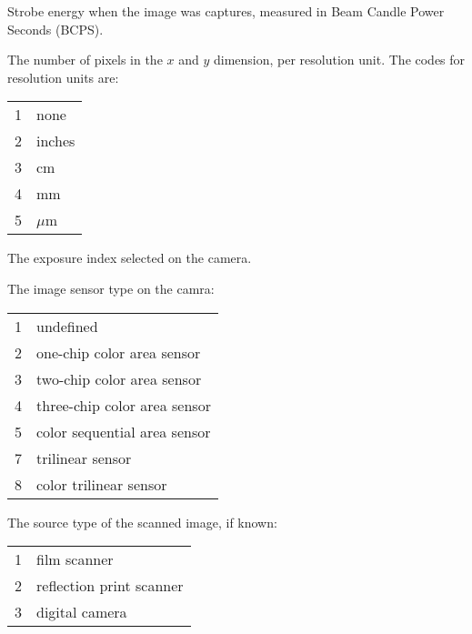 
Strobe energy when the image was captures, measured in Beam Candle Power
Seconds (BCPS).
\apiend


The number of pixels in the $x$ and $y$ dimension, per resolution unit.
The codes for resolution units are:
\smallskip

\begin{tabular}{p{0.3in} p{4in}}
1 & none \\
2 & inches \\
3 & cm \\
4 & mm \\
5 & $\mu$m \\
\end{tabular}
\apiend



The exposure index selected on the camera.
\apiend

The image sensor type on the camra:
\smallskip

\begin{tabular}{p{0.3in} p{4in}}
1 & undefined \\
2 & one-chip color area sensor \\
3 & two-chip color area sensor \\
4 & three-chip color area sensor \\
5 & color sequential area sensor \\
7 & trilinear sensor \\
8 & color trilinear sensor 
\end{tabular}
\apiend

The source type of the scanned image, if known:
\smallskip

\begin{tabular}{p{0.3in} p{4in}}
1 & film scanner \\
2 & reflection print scanner \\
3 & digital camera \\
\end{tabular}
\apiend

